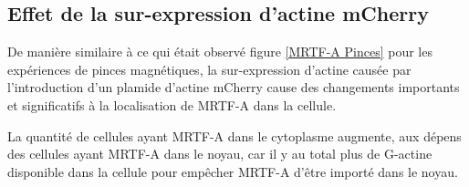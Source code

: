\documentclass{report}
\begin{document}
\subsection{Effet de la sur-expression d'actine mCherry}

De manière similaire à ce qui était observé figure \ref{MRTF-A Pinces} pour les expériences de pinces magnétiques, la sur-expression d'actine causée par l'introduction d'un plamide d'actine mCherry cause des changements importants et significatifs à la localisation de MRTF-A dans la cellule. 

La quantité de cellules ayant MRTF-A dans le cytoplasme augmente, aux dépens des cellules ayant MRTF-A dans le noyau, car il y au total plus de G-actine disponible dans la cellule pour empêcher MRTF-A d'être importé dans le noyau. 
\end{document}
